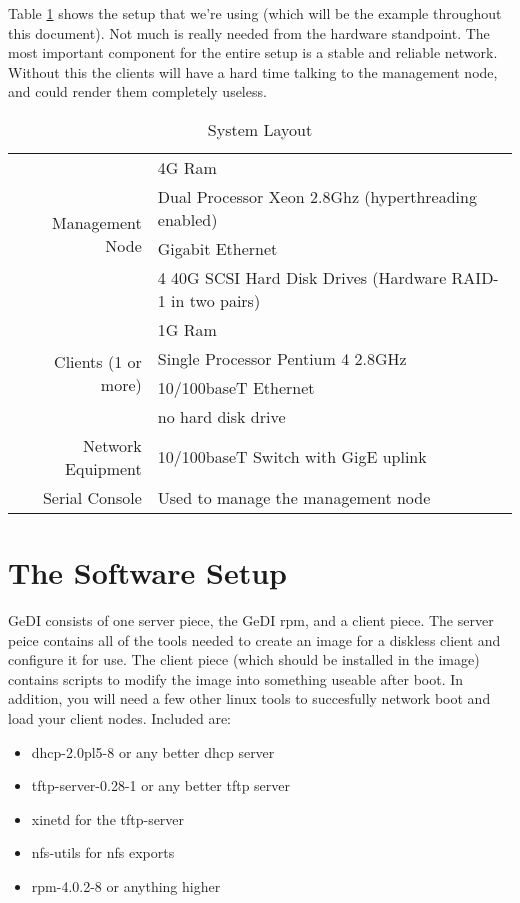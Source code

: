 \documentclass[10pt,a4paper,titlepage]{article}
\begin{document}
Table \ref{tab:sysConfig} shows the setup that we're using (which will be the
example throughout this document).  Not much is really needed from the hardware
standpoint.  The most important component for the entire setup is a stable and
reliable network.  Without this the clients will have a hard time talking to
the management node, and could render them completely useless.

\begin{table}[ht]
\center
\caption{System Layout}
\begin{tabular}{|r||l|}
\hline
\multirow{4}{*}{Management Node} & 4G Ram \\
& Dual Processor Xeon 2.8Ghz (hyperthreading enabled) \\
& Gigabit Ethernet \\
& 4 40G SCSI Hard Disk Drives (Hardware RAID-1 in two pairs) \\
\hline\hline
\multirow{4}{*}{Clients (1 or more)} & 1G Ram \\
& Single Processor Pentium 4 2.8GHz \\
& 10/100baseT Ethernet \\
& no hard disk drive \\
\hline\hline
Network Equipment & 10/100baseT Switch with GigE uplink \\
\hline
Serial Console & Used to manage the management node \\
\hline
\end{tabular}
\label{tab:sysConfig}
\end{table}

\section{The Software Setup}
GeDI consists of one server piece, the GeDI rpm, and a client piece.  The server
peice contains all of the tools needed to create an image for a diskless client
and configure it for use.  The client piece (which should be installed in the
image) contains scripts to modify the image into something useable after boot.
In addition, you will need a few other linux tools to succesfully network boot
and load your client nodes.  Included are:
\begin{itemize}
\parskip=0pt
\item dhcp-2.0pl5-8 or any better dhcp server
\item tftp-server-0.28-1 or any better tftp server
\item xinetd for the tftp-server
\item nfs-utils for nfs exports
\item rpm-4.0.2-8 or anything higher
\end{itemize}
\end{document}
